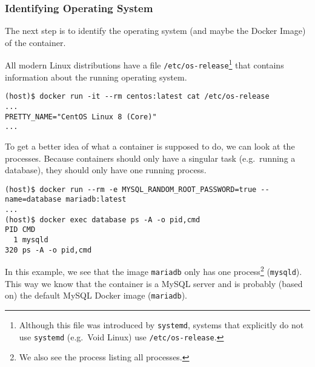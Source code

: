 \subsubsection{Identifying Operating System}

The next step is to identify the operating system (and maybe the Docker Image) of the container.

All modern Linux distributions have a file \lstinline{/etc/os-release}\footnote{Although this file was introduced by \lstinline{systemd}, systems that explicitly do not use \lstinline{systemd} (e.g.\ Void Linux) use \lstinline{/etc/os-release}.} that contains information about the running operating system.
\begin{lstlisting}[caption={CentOS container \lstinline{/etc/os-release}.},captionpos=b]
(host)$ docker run -it --rm centos:latest cat /etc/os-release
...
PRETTY_NAME="CentOS Linux 8 (Core)"
...
\end{lstlisting}

To get a better idea of what a container is supposed to do, we can look at the processes. Because containers should only have a singular task (e.g.\ running a database), they should only have one running process.

\begin{lstlisting}[caption={A container only has one process.},captionpos=b]
(host)$ docker run --rm -e MYSQL_RANDOM_ROOT_PASSWORD=true --name=database mariadb:latest
...
(host)$ docker exec database ps -A -o pid,cmd
PID CMD
  1 mysqld
320 ps -A -o pid,cmd
\end{lstlisting}

In this example, we see that the image \lstinline{mariadb} only has one process\footnote{We also see the process listing all processes.} (\lstinline{mysqld}). This way we know that the container is a MySQL server and is probably (based on) the default MySQL Docker image (\lstinline{mariadb}).
